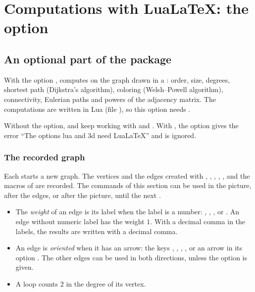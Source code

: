 \section{Computations with LuaLaTeX: the option }
\subsection{An optional part of the package}
With the option ,  computes on the graph drawn in a
: order, size, degrees, shortest path (Dijkstra's
algorithm), coloring (Welsh--Powell algorithm), connectivity, Eulerian paths
and powers of the adjacency matrix. The computations are
written in Lua (file ), so this option needs
.

\begin{tkzltxexample}[]
\usepackage[lua]{tkz-graph}  %
\end{tkzltxexample}

Without the option,  and  keep
working with  and . With
, the option gives the error ``The options lua and 3d need
LuaLaTeX'' and is ignored.

\subsubsection{The recorded graph}
Each  starts a new graph. The vertices and the edges
created with , , ,
, ,  and the
macros of  are recorded. The commands of this section
can be used in the picture, after the edges, or after the picture, until the
next .

\begin{itemize}
\item The \emph{weight} of an edge is its label when the label is a number:
, , ,  or
. An edge without numeric label
has the weight $1$. With a decimal comma in the labels, the results are
written with a decimal comma.
\item An edge is \emph{oriented} when it has an arrow: the keys
\tkzname{->}, \tkzname{<-}, \tkzname{<->}, , or an arrow in
its option . The other edges can be used in both directions,
unless the option  is given.
\item A loop counts $2$ in the degree of its vertex.
\end{itemize}

